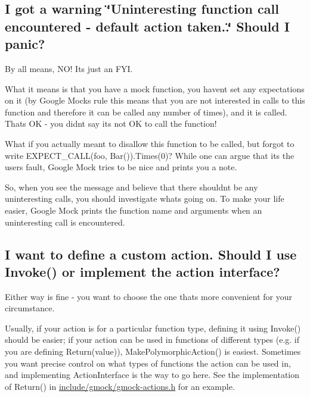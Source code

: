 \subsection*{I got a warning \char`\"{}\+Uninteresting function call encountered -\/ default action taken..\char`\"{} Should I panic?}

By all means, N\+O! It\textquotesingle{}s just an F\+YI.

What it means is that you have a mock function, you haven\textquotesingle{}t set any expectations on it (by Google Mock\textquotesingle{}s rule this means that you are not interested in calls to this function and therefore it can be called any number of times), and it is called. That\textquotesingle{}s OK -\/ you didn\textquotesingle{}t say it\textquotesingle{}s not OK to call the function!

What if you actually meant to disallow this function to be called, but forgot to write {\ttfamily E\+X\+P\+E\+C\+T\+\_\+\+C\+A\+L\+L(foo, Bar()).Times(0)}? While one can argue that it\textquotesingle{}s the user\textquotesingle{}s fault, Google Mock tries to be nice and prints you a note.

So, when you see the message and believe that there shouldn\textquotesingle{}t be any uninteresting calls, you should investigate what\textquotesingle{}s going on. To make your life easier, Google Mock prints the function name and arguments when an uninteresting call is encountered.

\subsection*{I want to define a custom action. Should I use Invoke() or implement the action interface?}

Either way is fine -\/ you want to choose the one that\textquotesingle{}s more convenient for your circumstance.

Usually, if your action is for a particular function type, defining it using {\ttfamily Invoke()} should be easier; if your action can be used in functions of different types (e.\+g. if you are defining {\ttfamily Return(value)}), {\ttfamily Make\+Polymorphic\+Action()} is easiest. Sometimes you want precise control on what types of functions the action can be used in, and implementing {\ttfamily Action\+Interface} is the way to go here. See the implementation of {\ttfamily Return()} in {\ttfamily \mbox{\hyperlink{gmock-actions_8h_source}{include/gmock/gmock-\/actions.\+h}}} for an example.


